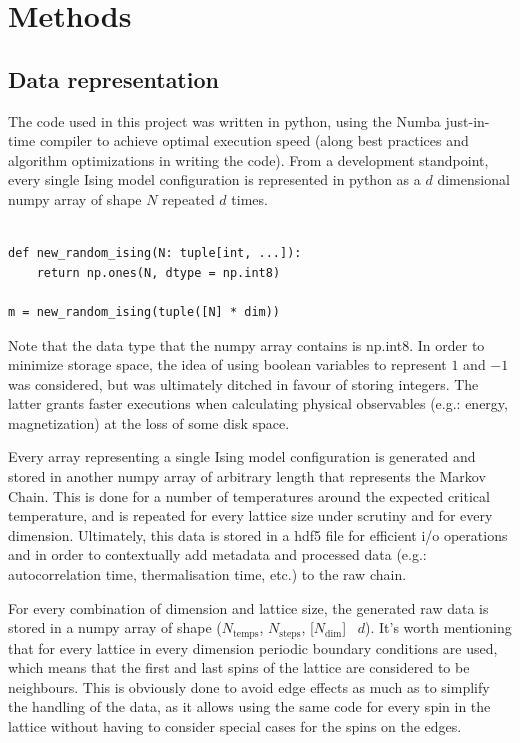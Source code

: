 \chapter{Methods}

\section{Data representation}

The code used in this project was written in python, using the Numba just-in-time compiler to achieve optimal execution speed (along best practices and algorithm optimizations in writing the code). From a development standpoint, every single Ising model configuration is represented in python as a $d$ dimensional numpy array of shape $N$ repeated $d$ times.

\begin{verbatim}

def new_random_ising(N: tuple[int, ...]):
    return np.ones(N, dtype = np.int8)

m = new_random_ising(tuple([N] * dim))

\end{verbatim}

Note that the data type that the numpy array contains is np.int8. In order to minimize storage space, the idea of using boolean variables to represent $1$ and $-1$ was considered, but was ultimately ditched in favour of storing integers. The latter grants faster executions when calculating physical observables (e.g.: energy, magnetization) at the loss of some disk space.

\br

Every array representing a single Ising model configuration is generated and stored in another numpy array of arbitrary length that represents the Markov Chain. This is done for a number of temperatures around the expected critical temperature, and is repeated for every lattice size under scrutiny and for every dimension. Ultimately, this data is stored in a hdf5 file for efficient i/o operations and in order to contextually add metadata and processed data (e.g.: autocorrelation time, thermalisation time, etc.) to the raw chain.

For every combination of dimension and lattice size, the generated raw data is stored in a numpy array of shape ($N_{\text{temps}}$, $N_{\text{steps}}$, [$N_{\text{dim}}$] \times \, $d$).
It's worth mentioning that for every lattice in every dimension periodic boundary conditions are used, which means that the first and last spins of the lattice are considered to be neighbours. This is obviously done to avoid edge effects as much as to simplify the handling of the data, as it allows using the same code for every spin in the lattice without having to consider special cases for the spins on the edges.

